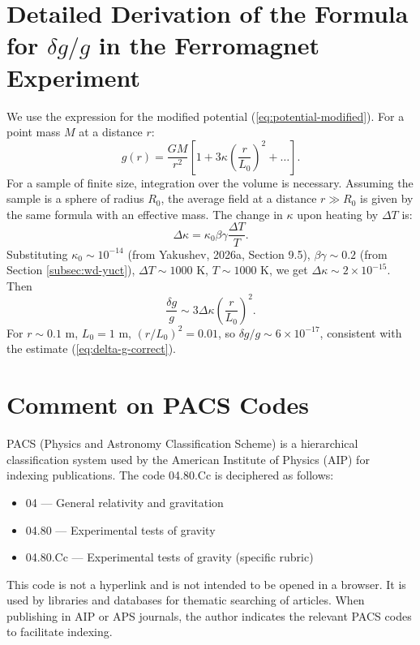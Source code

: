 \documentclass[12pt]{article}
\theoremstyle{remark}
\begin{document}
	\section{Detailed Derivation of the Formula for $\delta g/g$ in the Ferromagnet Experiment}
	\label{app:delta-g-derivation}
	
	We use the expression for the modified potential (\ref{eq:potential-modified}). For a point mass $M$ at a distance $r$:
	\begin{equation}
		g(r) = \frac{GM}{r^2} \left[ 1 + 3\kappa \left( \frac{r}{L_0} \right)^2 + \dots \right].
		\label{eq:g-modified}
	\end{equation}
	For a sample of finite size, integration over the volume is necessary. Assuming the sample is a sphere of radius $R_0$, the average field at a distance $r \gg R_0$ is given by the same formula with an effective mass. The change in $\kappa$ upon heating by $\Delta T$ is:
	\begin{equation}
		\Delta\kappa = \kappa_0 \beta\gamma \frac{\Delta T}{T}.
		\label{eq:delta-kappa}
	\end{equation}
	Substituting $\kappa_0 \sim 10^{-14}$ (from Yakushev, 2026a, Section 9.5), $\beta\gamma \sim 0.2$ (from Section \ref{subsec:wd-yuct}), $\Delta T \sim 1000$ K, $T \sim 1000$ K, we get $\Delta\kappa \sim 2\times10^{-15}$. Then
	\begin{equation}
		\frac{\delta g}{g} \sim 3\Delta\kappa \left( \frac{r}{L_0} \right)^2.
		\label{eq:delta-g-final}
	\end{equation}
	For $r \sim 0.1$ m, $L_0 = 1$ m, $(r/L_0)^2 = 0.01$, so $\delta g/g \sim 6\times10^{-17}$, consistent with the estimate (\ref{eq:delta-g-correct}).
	
	\section{Comment on PACS Codes}
	\label{app:pacs}
	
	PACS (Physics and Astronomy Classification Scheme) is a hierarchical classification system used by the American Institute of Physics (AIP) for indexing publications. The code 04.80.Cc is deciphered as follows:
	\begin{itemize}
		\item 04 — General relativity and gravitation
		\item 04.80 — Experimental tests of gravity
		\item 04.80.Cc — Experimental tests of gravity (specific rubric)
	\end{itemize}
	This code is not a hyperlink and is not intended to be opened in a browser. It is used by libraries and databases for thematic searching of articles. When publishing in AIP or APS journals, the author indicates the relevant PACS codes to facilitate indexing.
	
\end{document}
